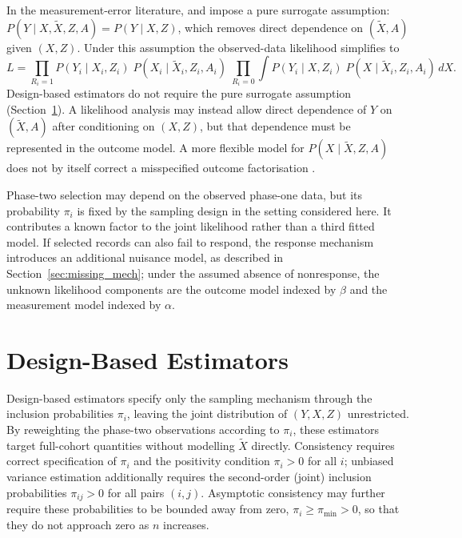 In the measurement-error literature, \citet{prentice1982covariate} and \citet{breslow1997maximum} impose a pure surrogate assumption: $P(Y \mid X, \tilde{X}, Z, A) = P(Y \mid X, Z)$, which removes direct dependence on $(\tilde{X}, A)$ given $(X, Z)$. Under this assumption the observed-data likelihood simplifies to
\begin{equation}
    L = \prod_{R_i=1}
    P(Y_i \mid X_i, Z_i)\;
    P(X_i \mid \tilde{X}_i, Z_i, A_i)
    \;\prod_{R_i=0}
    \int P(Y_i \mid X, Z_i)\;
    P(X \mid \tilde{X}_i, Z_i, A_i)\, dX.
    \label{eq:obs_lik_pure}
\end{equation}
Design-based estimators do not require the pure surrogate assumption (Section~\ref{sec:DBE}). A likelihood analysis may instead allow direct dependence of $Y$ on $(\tilde{X},A)$ after conditioning on $(X,Z)$, but that dependence must be represented in the outcome model. A more flexible model for $P(X \mid \tilde{X}, Z, A)$ does not by itself correct a misspecified outcome factorisation \citep{prentice1982covariate, breslow1997maximum, breslow1999design}.

Phase-two selection may depend on the observed phase-one data, but its probability $\pi_i$ is fixed by the sampling design in the setting considered here. It contributes a known factor to the joint likelihood rather than a third fitted model. If selected records can also fail to respond, the response mechanism introduces an additional nuisance model, as described in Section~\ref{sec:missing_mech}; under the assumed absence of nonresponse, the unknown likelihood components are the outcome model indexed by $\beta$ and the measurement model indexed by $\alpha$.


\section{Design-Based Estimators}
\label{sec:DBE}

Design-based estimators specify only the sampling mechanism through the inclusion probabilities $\pi_i$, leaving the joint distribution of $(Y, X, Z)$ unrestricted. By reweighting the phase-two observations according to $\pi_i$, these estimators target full-cohort quantities without modelling $\tilde{X}$ directly. Consistency requires correct specification of $\pi_i$ and the positivity condition $\pi_i > 0$ for all $i$; unbiased variance estimation additionally requires the second-order (joint) inclusion probabilities $\pi_{ij} > 0$ for all pairs $(i,j)$. Asymptotic consistency may further require these probabilities to be bounded away from zero, $\pi_i \ge \pi_{\min} > 0$, so that they do not approach zero as $n$ increases.


